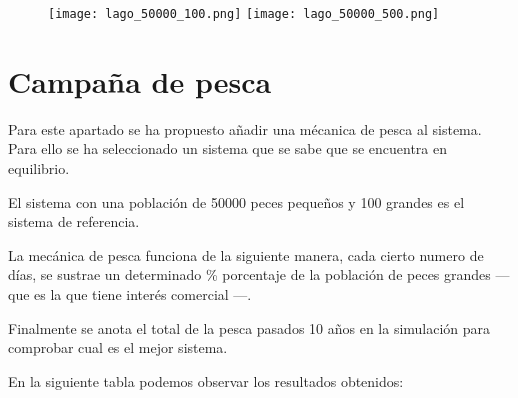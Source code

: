 \newpage

\begin{figure}[h]
\texttt{[image: lago\_50000\_100.png]}
\texttt{[image: lago\_50000\_500.png]}
\centering
\end{figure}

\newpage

\section{Campaña de pesca}

Para este apartado se ha propuesto añadir una mécanica de pesca al sistema. Para ello se ha seleccionado un sistema que se sabe que se encuentra en equilibrio.

El sistema con una población de 50000 peces pequeños y 100 grandes es el sistema de referencia.


La mecánica de pesca funciona de la siguiente manera, cada cierto numero de días, se sustrae un determinado \% porcentaje de la población de peces grandes --- que es la que tiene interés comercial ---.

Finalmente se anota el total de la pesca pasados 10 años en la simulación para comprobar cual es el mejor sistema.

En la siguiente tabla podemos observar los resultados obtenidos:
\begin{table}[h]
\centering
{}
\end{table}

